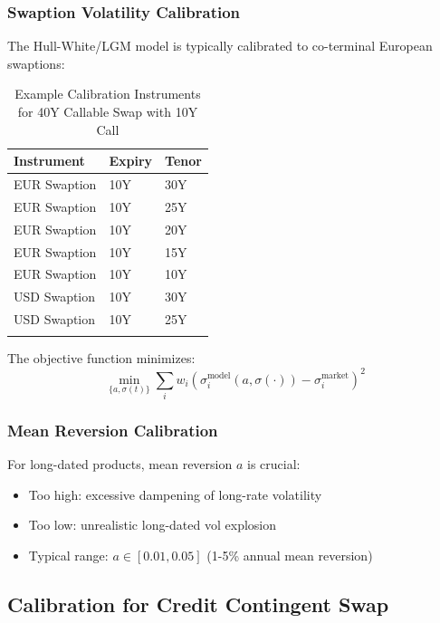 \documentclass[conference]{IEEEtran}
\theoremstyle{definition}
\begin{document}
\subsubsection{Swaption Volatility Calibration}

The Hull-White/LGM model is typically calibrated to co-terminal European swaptions:

\begin{table}[ht]
\centering
\caption{Example Calibration Instruments for 40Y Callable Swap with 10Y Call}
\label{tab:calib_inst}
\begin{tabularx}{\columnwidth}{>{\raggedright\arraybackslash}X>{\raggedright\arraybackslash}Xl}
\toprule
\textbf{Instrument} & \textbf{Expiry} & \textbf{Tenor} \\
\midrule
EUR Swaption & 10Y & 30Y \\
EUR Swaption & 10Y & 25Y \\
EUR Swaption & 10Y & 20Y \\
EUR Swaption & 10Y & 15Y \\
EUR Swaption & 10Y & 10Y \\
\midrule
USD Swaption & 10Y & 30Y \\
USD Swaption & 10Y & 25Y \\
\multicolumn{3}{c}{...} \\
\bottomrule
\end{tabularx}
\end{table}

The objective function minimizes:
\begin{equation}
\min_{\{a, \sigma(t)\}} \sum_{i} w_i \left( \sigma^{\text{model}}_i(a, \sigma(\cdot)) - \sigma^{\text{market}}_i \right)^2
\end{equation}

\subsubsection{Mean Reversion Calibration}

For long-dated products, mean reversion $a$ is crucial:
\begin{itemize}
    \item Too high: excessive dampening of long-rate volatility
    \item Too low: unrealistic long-dated vol explosion
    \item Typical range: $a \in [0.01, 0.05]$ (1-5\% annual mean reversion)
\end{itemize}

\subsection{Calibration for Credit Contingent Swap}
\end{document}

